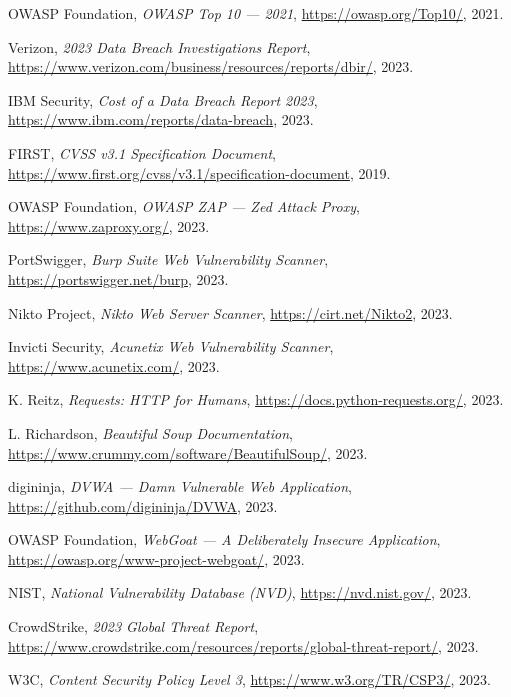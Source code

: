 \documentclass[12pt,a4paper]{report}
\begin{document}
\begin{enumerate}[label={[\arabic*]}]
  \item OWASP Foundation, \textit{OWASP Top 10 — 2021},
    \url{https://owasp.org/Top10/}, 2021.
  \item Verizon, \textit{2023 Data Breach Investigations Report},
    \url{https://www.verizon.com/business/resources/reports/dbir/}, 2023.
  \item IBM Security, \textit{Cost of a Data Breach Report 2023},
    \url{https://www.ibm.com/reports/data-breach}, 2023.
  \item FIRST, \textit{CVSS v3.1 Specification Document},
    \url{https://www.first.org/cvss/v3.1/specification-document}, 2019.
  \item OWASP Foundation, \textit{OWASP ZAP — Zed Attack Proxy},
    \url{https://www.zaproxy.org/}, 2023.
  \item PortSwigger, \textit{Burp Suite Web Vulnerability Scanner},
    \url{https://portswigger.net/burp}, 2023.
  \item Nikto Project, \textit{Nikto Web Server Scanner},
    \url{https://cirt.net/Nikto2}, 2023.
  \item Invicti Security, \textit{Acunetix Web Vulnerability Scanner},
    \url{https://www.acunetix.com/}, 2023.
  \item K. Reitz, \textit{Requests: HTTP for Humans},
    \url{https://docs.python-requests.org/}, 2023.
  \item L. Richardson, \textit{Beautiful Soup Documentation},
    \url{https://www.crummy.com/software/BeautifulSoup/}, 2023.
  \item digininja, \textit{DVWA — Damn Vulnerable Web Application},
    \url{https://github.com/digininja/DVWA}, 2023.
  \item OWASP Foundation, \textit{WebGoat — A Deliberately Insecure Application},
    \url{https://owasp.org/www-project-webgoat/}, 2023.
  \item NIST, \textit{National Vulnerability Database (NVD)},
    \url{https://nvd.nist.gov/}, 2023.
  \item CrowdStrike, \textit{2023 Global Threat Report},
    \url{https://www.crowdstrike.com/resources/reports/global-threat-report/}, 2023.
  \item W3C, \textit{Content Security Policy Level 3},
    \url{https://www.w3.org/TR/CSP3/}, 2023.
\end{enumerate}
\end{document}

